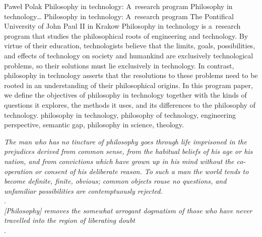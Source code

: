 \begin{artengenv}{Paweł Polak}
	{Philosophy in technology: A~research program}
	{Philosophy in technology\ldots}
	{Philosophy in technology: A~research program}
	{The Pontifical University of John Paul II in Krakow}
	{Philosophy in technology is a~research program that studies the philosophical roots of engineering and technology. By virtue of their education, technologists believe that the limits, goals, possibilities, and effects of technology on society and humankind are exclusively technological problems, so their solutions must lie exclusively in technology. In contrast, philosophy in technology asserts that the resolutions to these problems need to be rooted in an understanding of their philosophical origins. In this program paper, we define the objectives of philosophy in technology together with the kinds of questions it explores, the methods it uses, and its differences to the philosophy of technology. \enlargethispage{2.5\baselineskip}
	}
	{philosophy in technology, philosophy of technology, engineering perspective, semantic gap, philosophy in science, theology.}


\begin{customepigraph}
\textit{The man who has no tincture of philosophy goes through life imprisoned in the prejudices derived from common sense, from the habitual beliefs of his age or his nation, and from convictions which have grown up in his mind without the co-operation or consent of his deliberate reason. To such a man the world tends to become definite, finite, obvious; common objects rouse no questions, and unfamiliar possibilities are contemptuously rejected.} \\
\parencite[][p.243]{russell_problems_1912}. \\

\noindent\textit{[Philosophy] removes the somewhat arrogant dogmatism of those who have never travelled into the region of liberating doubt} \\
\parencite[][pp.243–244]{russell_problems_1912}. \\
\end{customepigraph}




\end{artengenv}
